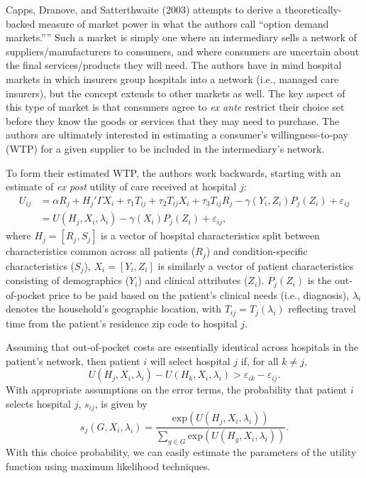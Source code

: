 \documentclass[
  letterpaper,
  DIV=11,
  numbers=noendperiod]{scrreport}
\theoremstyle{definition}
\theoremstyle{remark}
\begin{document}
Capps, Dranove, and Satterthwaite (2003) attempts to derive a
theoretically-backed measure of market power in what the authors call
``option demand markets.'''' Such a market is simply one where an
intermediary sells a network of suppliers/manufacturers to consumers,
and where consumers are uncertain about the final services/products they
will need. The authors have in mind hospital markets in which insurers
group hospitals into a network (i.e., managed care insurers), but the
concept extends to other markets as well. The key aspect of this type of
market is that consumers agree to \textit{ex ante} restrict their choice
set before they know the goods or services that they may need to
purchase. The authors are ultimately interested in estimating a
consumer's willingness-to-pay (WTP) for a given supplier to be included
in the intermediary's network.

To form their estimated WTP, the authors work backwards, starting with
an estimate of \textit{ex post} utility of care received at hospital
\(j\): \[\begin{align*}
U_{ij} &= \alpha R_{j} + H_{j}'\Gamma X_{i} + \tau_{1} T_{ij} + \tau_{2} T_{ij} X_{i} + \tau_{3} T_{ij} R_{j} - \gamma(Y_{i},Z_{i}) P_{j}(Z_{i}) + \varepsilon_{ij} \\
 &= U(H_{j},X_{i},\lambda_{i}) - \gamma(X_{i})P_{j}(Z_{i}) + \varepsilon_{ij},
\end{align*}\] where \(H_{j}=[R_{j},S_{j}]\) is a vector of hospital
characteristics split between characteristics common across all patients
(\(R_{j}\)) and condition-specific characteristics (\(S_{j}\)),
\(X_{i}=[Y_{i},Z_{i}]\) is similarly a vector of patient characteristics
consisting of demographics (\(Y_{i}\)) and clinical attributes
(\(Z_{i}\)). \(P_{j}(Z_{i})\) is the out-of-pocket price to be paid
based on the patient's clinical needs (i.e., diagnosis), \(\lambda_{i}\)
denotes the household's geographic location, with
\(T_{ij}=T_{j}(\lambda_{i})\) reflecting travel time from the patient's
residence zip code to hospital \(j\).

Assuming that out-of-pocket costs are essentially identical across
hospitals in the patient's network, then patient \(i\) will select
hospital \(j\) if, for all \(k \neq j\),
\[U(H_{j},X_{i},\lambda_{i}) - U(H_{k},X_{i},\lambda_{i}) > \varepsilon_{ik} - \varepsilon_{ij}.\]
With appropriate assumptions on the error terms, the probability that
patient \(i\) selects hospital \(j\), \(s_{ij}\), is given by
\[s_{j}(G,X_{i},\lambda_{i}) = \frac{\text{exp}(U(H_{j},X_{i},\lambda_{i}))}{\sum_{g\in G}\text{exp}(U(H_{g},X_{i},\lambda_{i}))}.\]
With this choice probability, we can easily estimate the parameters of
the utility function using maximum likelihood techniques.
\end{document}
